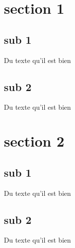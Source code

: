 
\section{section 1}
\subsection{sub 1}

Du texte qu'il est bien \cite{zander2011}

\subsection{sub 2}

Du texte qu'il est bien

\section{section 2}

\subsection{sub 1}

Du texte qu'il est bien

\subsection{sub 2}

Du texte qu'il est bien

